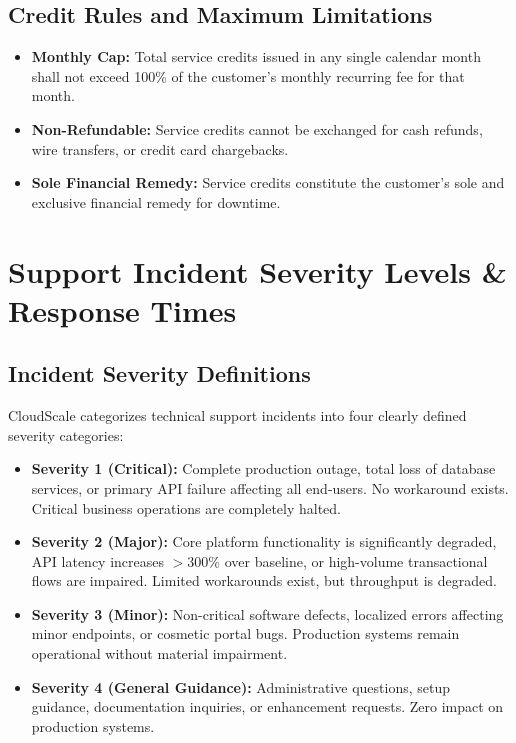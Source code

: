 \documentclass[10pt,letterpaper]{article}
\begin{document}
\subsection{Credit Rules and Maximum Limitations}
\begin{itemize}[leftmargin=1.5em, itemsep=0.5pt, topsep=1pt]
  \item \textbf{Monthly Cap:} Total service credits issued in any single calendar month shall not exceed 100\% of the customer's monthly recurring fee for that month.
  \item \textbf{Non-Refundable:} Service credits cannot be exchanged for cash refunds, wire transfers, or credit card chargebacks.
  \item \textbf{Sole Financial Remedy:} Service credits constitute the customer's sole and exclusive financial remedy for downtime.
\end{itemize}

\newpage

\section{Support Incident Severity Levels \& Response Times}

\subsection{Incident Severity Definitions}
CloudScale categorizes technical support incidents into four clearly defined severity categories:
\begin{itemize}[leftmargin=1.5em, itemsep=0.5pt, topsep=1pt]
  \item \textbf{Severity 1 (Critical):} Complete production outage, total loss of database services, or primary API failure affecting all end-users. No workaround exists. Critical business operations are completely halted.
  \item \textbf{Severity 2 (Major):} Core platform functionality is significantly degraded, API latency increases $>300\%$ over baseline, or high-volume transactional flows are impaired. Limited workarounds exist, but throughput is degraded.
  \item \textbf{Severity 3 (Minor):} Non-critical software defects, localized errors affecting minor endpoints, or cosmetic portal bugs. Production systems remain operational without material impairment.
  \item \textbf{Severity 4 (General Guidance):} Administrative questions, setup guidance, documentation inquiries, or enhancement requests. Zero impact on production systems.
\end{itemize}
\end{document}
